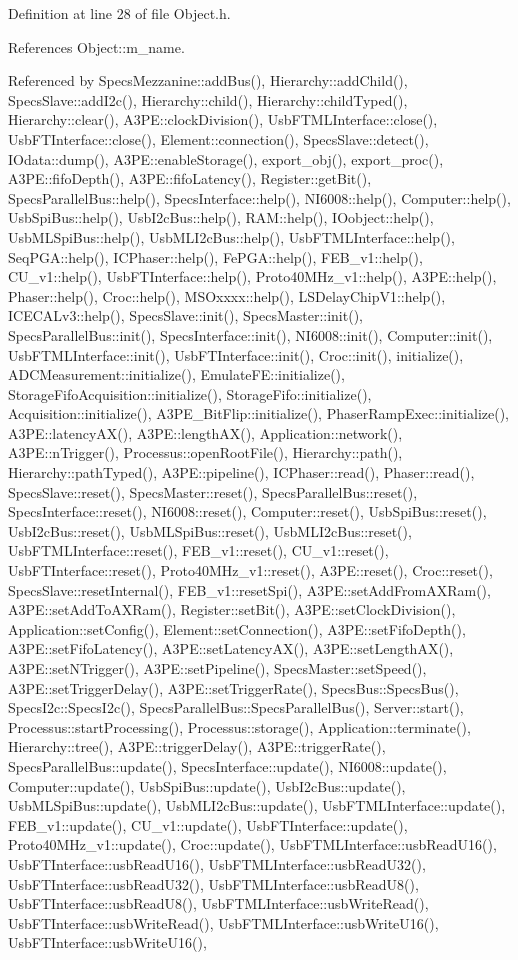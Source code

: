 Definition at line 28 of file Object.h.

References Object::m\_\-name.

Referenced by SpecsMezzanine::addBus(), Hierarchy::addChild(), SpecsSlave::addI2c(), Hierarchy::child(), Hierarchy::childTyped(), Hierarchy::clear(), A3PE::clockDivision(), UsbFTMLInterface::close(), UsbFTInterface::close(), Element::connection(), SpecsSlave::detect(), IOdata::dump(), A3PE::enableStorage(), export\_\-obj(), export\_\-proc(), A3PE::fifoDepth(), A3PE::fifoLatency(), Register::getBit(), SpecsParallelBus::help(), SpecsInterface::help(), NI6008::help(), Computer::help(), UsbSpiBus::help(), UsbI2cBus::help(), RAM::help(), IOobject::help(), UsbMLSpiBus::help(), UsbMLI2cBus::help(), UsbFTMLInterface::help(), SeqPGA::help(), ICPhaser::help(), FePGA::help(), FEB\_\-v1::help(), CU\_\-v1::help(), UsbFTInterface::help(), Proto40MHz\_\-v1::help(), A3PE::help(), Phaser::help(), Croc::help(), MSOxxxx::help(), LSDelayChipV1::help(), ICECALv3::help(), SpecsSlave::init(), SpecsMaster::init(), SpecsParallelBus::init(), SpecsInterface::init(), NI6008::init(), Computer::init(), UsbFTMLInterface::init(), UsbFTInterface::init(), Croc::init(), initialize(), ADCMeasurement::initialize(), EmulateFE::initialize(), StorageFifoAcquisition::initialize(), StorageFifo::initialize(), Acquisition::initialize(), A3PE\_\-BitFlip::initialize(), PhaserRampExec::initialize(), A3PE::latencyAX(), A3PE::lengthAX(), Application::network(), A3PE::nTrigger(), Processus::openRootFile(), Hierarchy::path(), Hierarchy::pathTyped(), A3PE::pipeline(), ICPhaser::read(), Phaser::read(), SpecsSlave::reset(), SpecsMaster::reset(), SpecsParallelBus::reset(), SpecsInterface::reset(), NI6008::reset(), Computer::reset(), UsbSpiBus::reset(), UsbI2cBus::reset(), UsbMLSpiBus::reset(), UsbMLI2cBus::reset(), UsbFTMLInterface::reset(), FEB\_\-v1::reset(), CU\_\-v1::reset(), UsbFTInterface::reset(), Proto40MHz\_\-v1::reset(), A3PE::reset(), Croc::reset(), SpecsSlave::resetInternal(), FEB\_\-v1::resetSpi(), A3PE::setAddFromAXRam(), A3PE::setAddToAXRam(), Register::setBit(), A3PE::setClockDivision(), Application::setConfig(), Element::setConnection(), A3PE::setFifoDepth(), A3PE::setFifoLatency(), A3PE::setLatencyAX(), A3PE::setLengthAX(), A3PE::setNTrigger(), A3PE::setPipeline(), SpecsMaster::setSpeed(), A3PE::setTriggerDelay(), A3PE::setTriggerRate(), SpecsBus::SpecsBus(), SpecsI2c::SpecsI2c(), SpecsParallelBus::SpecsParallelBus(), Server::start(), Processus::startProcessing(), Processus::storage(), Application::terminate(), Hierarchy::tree(), A3PE::triggerDelay(), A3PE::triggerRate(), SpecsParallelBus::update(), SpecsInterface::update(), NI6008::update(), Computer::update(), UsbSpiBus::update(), UsbI2cBus::update(), UsbMLSpiBus::update(), UsbMLI2cBus::update(), UsbFTMLInterface::update(), FEB\_\-v1::update(), CU\_\-v1::update(), UsbFTInterface::update(), Proto40MHz\_\-v1::update(), Croc::update(), UsbFTMLInterface::usbReadU16(), UsbFTInterface::usbReadU16(), UsbFTMLInterface::usbReadU32(), UsbFTInterface::usbReadU32(), UsbFTMLInterface::usbReadU8(), UsbFTInterface::usbReadU8(), UsbFTMLInterface::usbWriteRead(), UsbFTInterface::usbWriteRead(), UsbFTMLInterface::usbWriteU16(), UsbFTInterface::usbWriteU16(), 